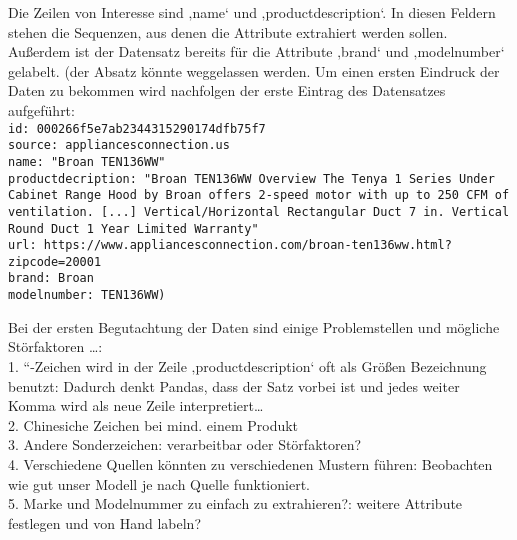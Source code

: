 \documentclass[paper=a4,12pt,listof=totoc]{scrartcl}%
\begin{document}
	Die Zeilen von Interesse sind ‚name‘ und ‚productdescription‘. In diesen Feldern stehen die Sequenzen, aus denen die Attribute extrahiert werden sollen. Außerdem ist der Datensatz bereits für die Attribute ‚brand‘ und ‚modelnumber‘ gelabelt. 
	(der Absatz könnte weggelassen werden. Um einen ersten Eindruck der Daten zu bekommen wird nachfolgen der erste Eintrag des Datensatzes aufgeführt:\\
	\texttt{id: 000266f5e7ab2344315290174dfb75f7 \\
		source: appliancesconnection.us\\
		name: "Broan TEN136WW"\\
		productdecription: "Broan TEN136WW Overview The Tenya 1 Series Under Cabinet Range Hood by Broan offers 2-speed motor with up to 250 CFM of ventilation. [...] Vertical/Horizontal Rectangular Duct 7 in. Vertical Round Duct 1 Year Limited Warranty"\\
		url: https://www.appliancesconnection.com/broan-ten136ww.html?zipcode=20001\\
		brand: Broan\\
		modelnumber: TEN136WW)}
		
	Bei der ersten Begutachtung der Daten sind einige Problemstellen und mögliche Störfaktoren …:\\
		1.	“-Zeichen wird in der Zeile ‚productdescription‘ oft als Größen Bezeichnung benutzt: Dadurch denkt Pandas, dass der Satz vorbei ist und jedes weiter Komma wird als neue Zeile interpretiert…\\
		2.	Chinesiche Zeichen bei mind. einem Produkt\\
		3.	Andere Sonderzeichen: verarbeitbar oder Störfaktoren?\\
		4.	Verschiedene Quellen könnten zu verschiedenen Mustern führen: Beobachten wie gut unser Modell je nach Quelle funktioniert.\\
		5.	Marke und Modelnummer zu einfach zu extrahieren?: weitere Attribute festlegen und von Hand labeln?\\
	
		
	\printbibliography[title=Literaturverzeichnis]
\end{document}
